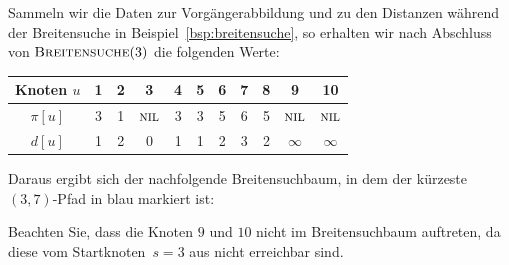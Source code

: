 \begin{bsp}
Sammeln wir die Daten zur Vorgängerabbildung und zu den Distanzen während der Breitensuche in Beispiel~\ref{bsp:breitensuche}, so erhalten wir nach Abschluss von $\mathop{\text{\textsc{Breitensuche}}}(3)$ die folgenden Werte:

\begin{table}[H]
\centering
\begin{tabular}{|c|c|c|c|c|c|c|c|c|c|c|}
\hline
\textbf{Knoten $u$}        & \textbf{1} & \textbf{2} & \textbf{3} & \textbf{4} & \textbf{5} & \textbf{6} & \textbf{7} & \textbf{8} & \textbf{9} & \textbf{10} \\ \hline
\textbf{$\pi[u]$}    & 3          & 1          & $\mathop{\text{\textsc{nil}}}$          & 3          & 3          & 5          & 6         & 5         & $\mathop{\text{\textsc{nil}}}$         & $\mathop{\text{\textsc{nil}}}$          \\ \hline
\textbf{$d[u]$} & 1          & 2          & 0         & 1          & 1         & 2         & 3         & 2         & $\infty$         & $\infty$          \\ \hline
\end{tabular}
\end{table}

Daraus ergibt sich der nachfolgende Breitensuchbaum, in dem der kürzeste $(3,7)$-Pfad in blau markiert ist:

\begin{center} 
\end{center} 

Beachten Sie, dass die Knoten $9$ und $10$ nicht im Breitensuchbaum auftreten, da diese vom Startknoten~$s=3$ aus nicht erreichbar sind.
\end{bsp}

